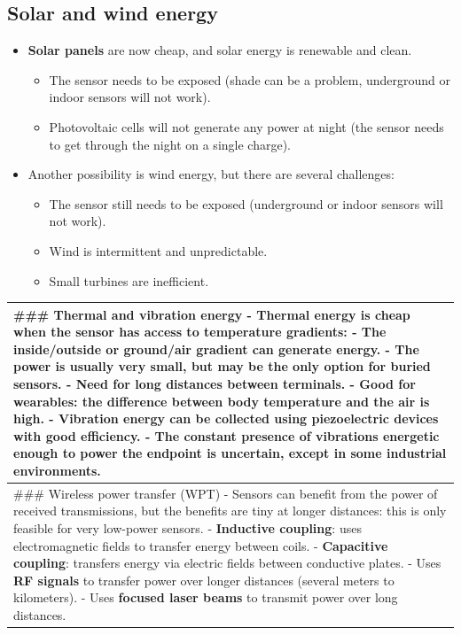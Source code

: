 \documentclass[a4paper, 12pt]{book} %
\begin{document}
\subsection{Solar and wind energy}\label{solar-and-wind-energy}

\begin{itemize}
\tightlist
\item
  \textbf{Solar panels} are now cheap, and solar energy is renewable and
  clean.

  \begin{itemize}
  \tightlist
  \item
    The sensor needs to be exposed (shade can be a problem, underground
    or indoor sensors will not work).
  \item
    Photovoltaic cells will not generate any power at night (the sensor
    needs to get through the night on a single charge).
  \end{itemize}
\item
  Another possibility is wind energy, but there are several challenges:

  \begin{itemize}
  \tightlist
  \item
    The sensor still needs to be exposed (underground or indoor sensors
    will not work).
  \item
    Wind is intermittent and unpredictable.
  \item
    Small turbines are inefficient.
  \end{itemize}
\end{itemize}

\begin{longtable}[]{@{}
  >{\raggedright\arraybackslash}p{}@{}}
\toprule\noalign{}
\begin{minipage}[b]{\linewidth}\raggedright
\#\#\# Thermal and vibration energy - \textbf{Thermal energy} is cheap
when the sensor has access to temperature gradients: - The
inside/outside or ground/air gradient can generate energy. - The power
is usually very small, but may be the only option for buried sensors. -
Need for long distances between terminals. - Good for wearables: the
difference between body temperature and the air is high. - Vibration
energy can be collected using piezoelectric devices with good
efficiency. - The constant presence of vibrations energetic enough to
power the endpoint is uncertain, except in some industrial environments.
\end{minipage} \\
\midrule\noalign{}
\endhead
\bottomrule\noalign{}
\endlastfoot
\#\#\# Wireless power transfer (WPT) - Sensors can benefit from the
power of received transmissions, but the benefits are tiny at longer
distances: this is only feasible for very low-power sensors. -
\textbf{Inductive coupling}: uses electromagnetic fields to transfer
energy between coils. - \textbf{Capacitive coupling}: transfers energy
via electric fields between conductive plates. - Uses \textbf{RF
signals} to transfer power over longer distances (several meters to
kilometers). - Uses \textbf{focused laser beams} to transmit power over
long distances. \\
\end{longtable}
\end{document}

